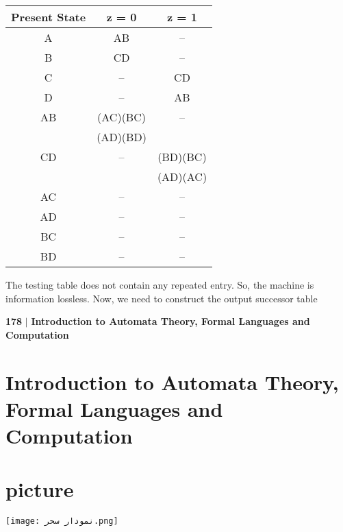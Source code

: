 \documentclass[a4,9pt]{beamer}
\begin{document}
\begin{frame}

\begin{center}
  \begin{tabular}{ccc}
\hline

\hline

\hline

\hline
Present State & z = 0 & z = 1\\
\hline
 A &     AB    &     --      \\
 B &     CD    &     --      \\
 C &     --    &     CD      \\
 D &     --    &     AB      \\
\hline
AB & (AC)(BC)  &     --      \\
   & (AD)(BD)  &             \\
CD &   --      &  (BD)(BC)   \\
   &           &  (AD)(AC)   \\
AC &   --      &     --      \\
AD &   --      &     --      \\
BC &   --      &     --      \\
BD &   --      &     --      \\
\hline

\hline

\hline

\hline

  \end{tabular}
\end{center}

\pause
The testing table does not contain any repeated entry. So, the machine is information lossless. Now, we need to construct the output successor table

\end{frame}

\begin{frame}

 \begin{flushleft}
    \textbf{178}\hspace*{0.1cm} \textbf{$|$} \hspace*{0.1cm} {\tiny \textbf{Introduction to Automata Theory, Formal Languages and Computation}}
  \end{flushleft}
\section*{Introduction to Automata Theory, Formal Languages and Computation}
\vspace*{0.1cm}

\section{picture}
\texttt{[image: نمودار سحر.png]}

\end{frame}
\end{document}
